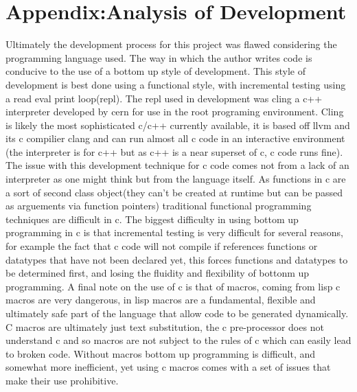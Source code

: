 \documentclass{article}
\begin{document}
\section{Appendix:Analysis of Development}
Ultimately the development process for this project was flawed considering the
programming language used. The way in which the author writes code is conducive
to the use of a bottom up style of development. This style of development is
best done using a functional style, with incremental testing using a read eval
print loop(repl). The repl used in development was cling a c++ interpreter
developed by cern for use in the root programing environment. Cling is likely
the most sophisticated c/c++ currently available, it is based off llvm and its
c compilier clang and can run almost all c code in an interactive environment
(the interpreter is for c++ but as c++ is a near superset of c, c code runs
fine). The issue with this development technique for c code comes not from a
lack of an interpreter as one might think but from the language itself. As
functions in c are a sort of second class object(they can't be created at
runtime but can be passed as arguements via function pointers) traditional
functional programming techniques are difficult in c. The biggest difficulty in
using bottom up programming in c is that incremental testing is very difficult
for several reasons, for example the fact that c code will not
compile if references functions or datatypes that have not been declared yet,
this forces functions and datatypes to be determined first, and losing the
fluidity and flexibility of bottonm up programming. A final note on the use of
c is that of macros, coming from lisp c macros are very dangerous, in lisp
macros are a fundamental, flexible and ultimately safe part of the language
that allow code to be generated dynamically. C macros are ultimately just text
substitution, the c pre-processor does not understand c and so macros are not
subject to the rules of c which can easily lead to broken code. Without macros
bottom up programming is difficult, and somewhat more inefficient, yet using c
macros comes with a set of issues that make their use prohibitive.
\end{document}
